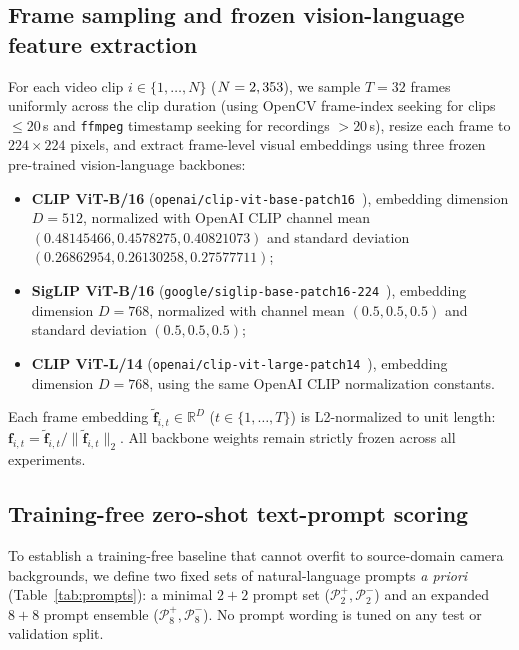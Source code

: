 \documentclass[pdflatex,sn-mathphys-num]{sn-jnl}
\begin{document}
\subsection{Frame sampling and frozen vision-language feature extraction}

For each video clip $i \in \{1, \dots, N\}$ ($N = 2,353{}$), we sample $T = 32$ frames uniformly across the clip duration (using OpenCV frame-index seeking for clips $\le 20$\,s and \texttt{ffmpeg} timestamp seeking for recordings $> 20$\,s), resize each frame to $224 \times 224$ pixels, and extract frame-level visual embeddings using three frozen pre-trained vision-language backbones:
\begin{itemize}
    \item \textbf{CLIP ViT-B/16} (\texttt{openai/clip-vit-base-patch16}~\cite{radford2021}), embedding dimension $D = 512$, normalized with OpenAI CLIP channel mean $(0.48145466, 0.4578275, 0.40821073)$ and standard deviation $(0.26862954, 0.26130258, 0.27577711)$;
    \item \textbf{SigLIP ViT-B/16} (\texttt{google/siglip-base-patch16-224}~\cite{zhai2023}), embedding dimension $D = 768$, normalized with channel mean $(0.5, 0.5, 0.5)$ and standard deviation $(0.5, 0.5, 0.5)$;
    \item \textbf{CLIP ViT-L/14} (\texttt{openai/clip-vit-large-patch14}~\cite{radford2021}), embedding dimension $D = 768$, using the same OpenAI CLIP normalization constants.
\end{itemize}
Each frame embedding $\tilde{\mathbf{f}}_{i,t} \in \mathbb{R}^D$ ($t \in \{1, \dots, T\}$) is L2-normalized to unit length: $\mathbf{f}_{i,t} = \tilde{\mathbf{f}}_{i,t} / \|\tilde{\mathbf{f}}_{i,t}\|_2$. All backbone weights remain strictly frozen across all experiments.

\subsection{Training-free zero-shot text-prompt scoring}

To establish a training-free baseline that cannot overfit to source-domain camera backgrounds, we define two fixed sets of natural-language prompts \emph{a priori} (Table~\ref{tab:prompts}): a minimal $2+2$ prompt set ($\mathcal{P}_2^+, \mathcal{P}_2^-$) and an expanded $8+8$ prompt ensemble ($\mathcal{P}_8^+, \mathcal{P}_8^-$). No prompt wording is tuned on any test or validation split.
\end{document}
